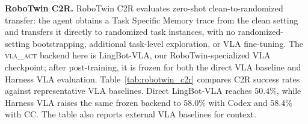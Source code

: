 \documentclass[11pt]{article}
\begin{document}
\begin{table}[htbp]
\centering
\caption{Per-task success rate (\%) on \textsc{LIBERO-Pro Goal}: zero-shot Harness VLA (CC) (no Task Specific Memory retrieval, $10$ seeds/task) vs Cap-X~\citep{fu2026cap}. \textbf{Pos} = swap (S), \textbf{Task} = instruction-redirection (T). Bold marks the winner within each setting and task or average column.}
\label{tab:zeroshot_vs_capx_transposed}
\small
{}
\end{table}

\textbf{RoboTwin C2R.} RoboTwin C2R evaluates zero-shot clean-to-randomized transfer: the agent obtains a Task Specific Memory trace from the clean setting and transfers it directly to randomized task instances, with no randomized-setting bootstrapping, additional task-level exploration, or VLA fine-tuning. The \textsc{vla\_act} backend here is LingBot-VLA, our RoboTwin-specialized VLA checkpoint; after post-training, it is frozen for both the direct VLA baseline and Harness VLA evaluation. Table~\ref{tab:robotwin_c2r} compares C2R success rates against representative VLA baselines. Direct LingBot-VLA reaches $50.4\%$, while Harness VLA raises the same frozen backend to $58.0\%$ with Codex and $58.4\%$ with CC. The table also reports external VLA baselines for context.
\end{document}
